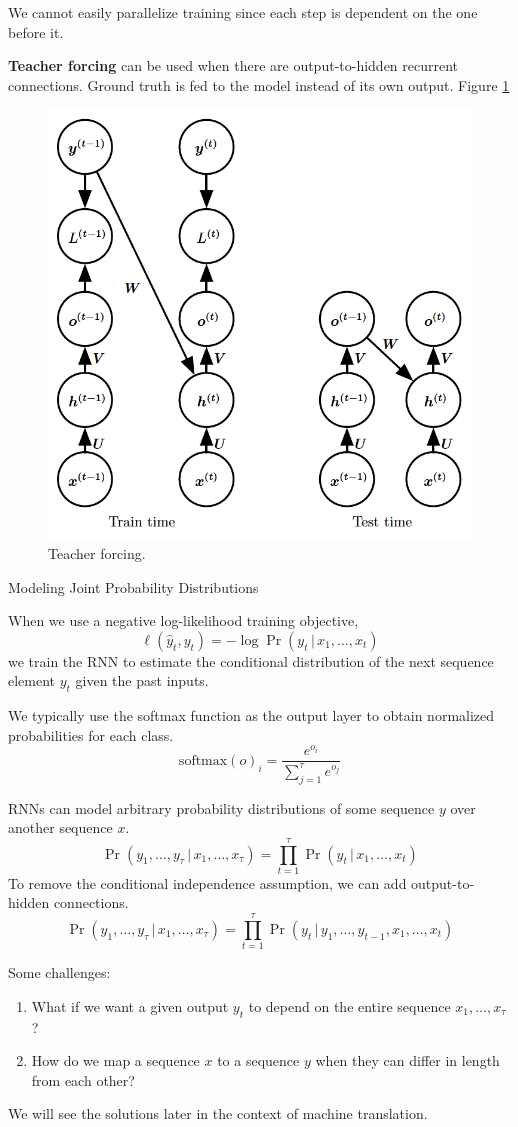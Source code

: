 \documentclass[english]{article}
\begin{document}
We cannot easily parallelize training since each step is dependent on the one before it.
 
\textbf{Teacher forcing} can be used when there are output-to-hidden recurrent connections. Ground truth is fed to the model instead of its own output.  Figure \ref{Teacher forcing}
\begin{figure}
\centering
\includegraphics[height=0.5\linewidth]{teacher-forcing.png}
    \caption{Teacher forcing.}
    \label{Teacher forcing}
\end{figure}
 

\item 
 {Modeling Joint Probability Distributions}

When we use a negative log-likelihood training objective,
$$\ell(\hat{y}_t,y_t) = -\log{\Pr(y_t\,|\,x_1,\dots,x_t)}$$
we train the RNN to estimate the conditional distribution of the next sequence element $y_t$ given the past inputs.
 
We typically use the softmax function as the output layer to obtain normalized probabilities for each class.
$$\text{softmax}(o)_i=\frac{e^{o_i}}{\sum_{j=1}^\tau e^{o_j}}$$
 

RNNs can model arbitrary probability distributions of some sequence $y$ over another sequence $x$.
$$\Pr(y_1,\dots,y_\tau\,|\,x_1,\dots,x_\tau) = \prod_{t=1}^\tau \Pr(y_t\,|\,x_1,\dots,x_t)$$
To remove the conditional independence assumption, we can add output-to-hidden connections.
$$\Pr(y_1,\dots,y_\tau\,|\,x_1,\dots,x_\tau) = \prod_{t=1}^\tau \Pr(y_t\,|\,y_1,\dots,y_{t-1}, x_1,\dots,x_t)$$
 

Some challenges:
\begin{enumerate}
\item What if we want a given output $y_t$ to depend on the entire sequence $x_1,\dots,x_\tau$?
\item How do we map a sequence $x$ to a sequence $y$ when they can differ in length from each other?
\end{enumerate}
\vspace{5mm}
We will see the solutions later in the context of machine translation.
 
\end{document}
